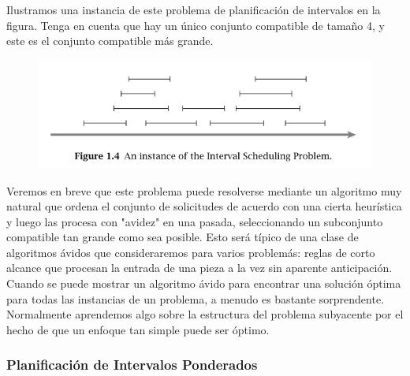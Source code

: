 \documentclass[a4paper]{article}
\begin{document}
Ilustramos una instancia de este problema de planificación de intervalos en la figura. Tenga en cuenta que hay un único conjunto compatible de tamaño 4, y este es el conjunto compatible más grande.\\


\begin{figure}[h]
\centering
\includegraphics[scale=0.7]{Imagenes-Seccion1/fig1-4.PNG}
\end{figure}


Veremos en breve que este problema puede resolverse mediante un algoritmo muy natural que ordena el conjunto de solicitudes de acuerdo con una cierta heurística y luego las procesa con "avidez" en una pasada, seleccionando un subconjunto compatible tan grande como sea posible. Esto será típico de una clase de algoritmos ávidos que consideraremos para varios problemás: reglas de corto alcance que procesan la entrada de una pieza a la vez sin aparente anticipación. Cuando se puede mostrar un algoritmo ávido para encontrar una solución óptima para todas las instancias de un problema, a menudo es bastante sorprendente. Normalmente aprendemos algo sobre la estructura del problema subyacente por el hecho de que un enfoque tan simple puede ser óptimo.\\

\subsubsection*{Planificación de Intervalos Ponderados}
\end{document}
